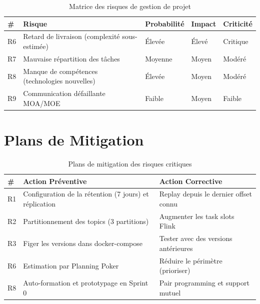 \begin{table}[H]
\centering
\begin{tabularx}{\textwidth}{C{0.7cm} X C{1.8cm} C{1.5cm} C{1.8cm}}
\toprule
\textbf{\color{primarycolor}\#} &
\textbf{\color{primarycolor}Risque} &
\textbf{\color{primarycolor}Probabilité} &
\textbf{\color{primarycolor}Impact} &
\textbf{\color{primarycolor}Criticité} \\
\midrule
R6 & Retard de livraison (complexité sous-estimée) & Élevée & Élevé & Critique \\
\addlinespace[0.1cm]
R7 & Mauvaise répartition des tâches & Moyenne & Moyen & Modéré \\
\addlinespace[0.1cm]
R8 & Manque de compétences (technologies nouvelles) & Élevée & Moyen & Modéré \\
\addlinespace[0.1cm]
R9 & Communication défaillante MOA/MOE & Faible & Moyen & Faible \\
\bottomrule
\end{tabularx}
\caption{Matrice des risques de gestion de projet}
\end{table}

\section{Plans de Mitigation}

\begin{table}[H]
\centering
\begin{tabularx}{\textwidth}{C{0.7cm} X X}
\toprule
\textbf{\color{primarycolor}\#} &
\textbf{\color{primarycolor}Action Préventive} &
\textbf{\color{primarycolor}Action Corrective} \\
\midrule
R1 & Configuration de la rétention (7 jours) et réplication & Replay depuis le dernier offset connu \\
\addlinespace[0.1cm]
R2 & Partitionnement des topics (3 partitions) & Augmenter les task slots Flink \\
\addlinespace[0.1cm]
R3 & Figer les versions dans docker-compose & Tester avec des versions antérieures \\
\addlinespace[0.1cm]
R6 & Estimation par Planning Poker & Réduire le périmètre (prioriser) \\
\addlinespace[0.1cm]
R8 & Auto-formation et prototypage en Sprint 0 & Pair programming et support mutuel \\
\bottomrule
\end{tabularx}
\caption{Plans de mitigation des risques critiques}
\end{table}

